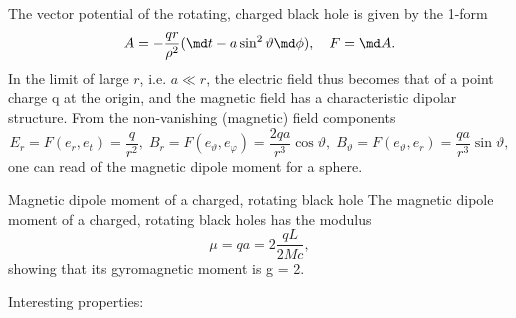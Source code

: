 \vspace{1.5cm}
The vector potential of the rotating,
charged black hole is given by the 1-form
\begin{equation}
	A = - \frac{q r}{\rho^2} (\md t - a \sin^2\vartheta \md \phi), \quad F=\md A.
\end{equation} 
In the limit of large $r$, i.e. $a \ll r$, the
electric field thus becomes that of a point charge q at the origin, and the
magnetic field has a characteristic dipolar structure. From the non-vanishing (magnetic) field components
\begin{equation}
	E_r = F(e_r,e_t)=\frac{q}{r^2}, \; B_r = F(e_{\vartheta}, e_{\varphi}) = \frac{2qa}{r^3} \cos \vartheta,\; B_{\vartheta} = F(e_{\vartheta}, e_r) = \frac{q a}{r^3} \sin \vartheta,
	\end{equation}
	 one can read of the magnetic dipole moment for a sphere.
	 \begin{mybox}{Magnetic dipole moment of a charged, rotating black hole}
	 The magnetic dipole moment of a charged, rotating black holes has the
	 modulus
\begin{equation}
	\mu = qa =2 \frac{qL}{2 Mc},
\end{equation}
	 showing that its gyromagnetic moment is g = 2.
	 \end{mybox}
 \vspace{1cm}
 Interesting properties:
